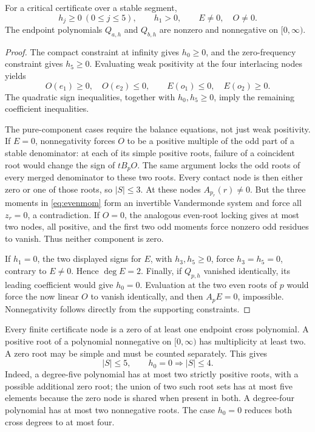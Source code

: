\documentclass[11pt]{article}
\begin{document}
\begin{lemma}\label{lem:support}
For a critical certificate over a stable segment,
\begin{equation}\label{eq:supportproperties}
 h_j\ge0\ (0\le j\le5),\qquad h_1>0,\qquad E\ne0,\quad O\ne0.
\end{equation}
The endpoint polynomials $Q_{a,h}$ and $Q_{b,h}$ are nonzero and nonnegative on $[0,\infty)$.
\end{lemma}
\begin{proof}
The compact constraint at infinity gives $h_0\ge0$, and the zero-frequency constraint gives $h_5\ge0$. Evaluating weak positivity at the four interlacing nodes yields
\[
 O(e_1)\ge0,\quad O(e_2)\le0,\qquad
 E(o_1)\le0,\quad E(o_2)\ge0.
\]
The quadratic sign inequalities, together with $h_0,h_5\ge0$, imply the remaining coefficient inequalities.

The pure-component cases require the balance equations, not just weak positivity. If $E=0$, nonnegativity forces $O$ to be a positive multiple of the odd part of a stable denominator: at each of its simple positive roots, failure of a coincident root would change the sign of $tB_pO$. The same argument locks the odd roots of every merged denominator to these two roots. Every contact node is then either zero or one of those roots, so $|S|\le3$. At these nodes $A_{p_r}(r)\ne0$. But the three moments in \eqref{eq:evenmom} form an invertible Vandermonde system and force all $z_r=0$, a contradiction. If $O=0$, the analogous even-root locking gives at most two nodes, all positive, and the first two odd moments force nonzero odd residues to vanish. Thus neither component is zero.

If $h_1=0$, the two displayed signs for $E$, with $h_3,h_5\ge0$, force $h_3=h_5=0$, contrary to $E\ne0$. Hence $\deg E=2$. Finally, if $Q_{p,h}$ vanished identically, its leading coefficient would give $h_0=0$. Evaluation at the two even roots of $p$ would force the now linear $O$ to vanish identically, and then $A_pE=0$, impossible. Nonnegativity follows directly from the supporting constraints.
\end{proof}

Every finite certificate node is a zero of at least one endpoint cross polynomial. A positive root of a polynomial nonnegative on $[0,\infty)$ has multiplicity at least two. A zero root may be simple and must be counted separately. This gives
\begin{equation}\label{eq:counts}
 |S|\le5,\qquad h_0=0\Longrightarrow |S|\le4.
\end{equation}
Indeed, a degree-five polynomial has at most two strictly positive roots, with a possible additional zero root; the union of two such root sets has at most five elements because the zero node is shared when present in both. A degree-four polynomial has at most two nonnegative roots. The case $h_0=0$ reduces both cross degrees to at most four.
\end{document}
